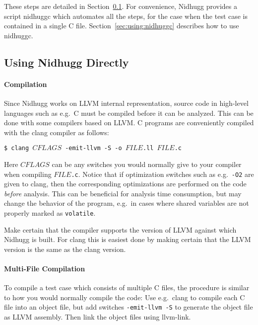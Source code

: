 \documentclass[a4paper]{article}
\begin{document}
These steps are detailed in
Section~\ref{sec:using:nidhugg:directly}. For convenience, Nidhugg
provides a script \textsf{nidhuggc} which automates all the steps, for
the case when the test case is contained in a single C
file. Section~\ref{sec:using:nidhuggc} describes how to use
\textsf{nidhuggc}.

\subsection{Using Nidhugg Directly}\label{sec:using:nidhugg:directly}

\paragraph{Compilation}
%
Since Nidhugg works on LLVM internal representation, source code in
high-level languages such as e.g.\ C must be compiled before it can be
analyzed. This can be done with some compilers based on LLVM. C
programs are conveniently compiled with the \textsf{clang} compiler as
follows:

\vspace{5pt}
\noindent
\texttt{\$ clang $CFLAGS$ -emit-llvm -S -o $FILE$.ll $FILE$.c}

\vspace{5pt}\noindent
%
Here $CFLAGS$ can be any switches you would normally give to your
compiler when compiling \texttt{$FILE$.c}. Notice that if optimization
switches such as e.g.\ \texttt{-O2} are given to \textsf{clang}, then
the corresponding optimizations are performed on the code
\emph{before} analysis. This can be beneficial for analysis time
consumption, but may change the behavior of the program, e.g.\ in cases
where shared variables are not properly marked as \texttt{volatile}.

Make certain that the compiler supports the version of LLVM against
which Nidhugg is built. For \textsf{clang} this is easiest done by
making certain that the LLVM version is the same as the \textsf{clang}
version.

\paragraph{Multi-File Compilation}
%
To compile a test case which consists of multiple C files, the
procedure is similar to how you would normally compile the code: Use
e.g.\ \textsf{clang} to compile each C file into an object file, but
add switches \texttt{-emit-llvm -S} to generate the object file as
LLVM assembly. Then link the object files using \textsf{llvm-link}.
\end{document}
